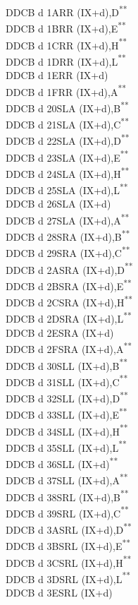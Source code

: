 \documentclass[twoside,openright,a4paper]{book}
\newcommand{\UNDOC}{\textnormal{\textsuperscript{**}}}
\begin{document}
\begin{multicols}{3}
{\begin{tabbing}
	DDCB d 1A\>RR (IX+d),D\UNDOC\\
	DDCB d 1B\>RR (IX+d),E\UNDOC\\
	DDCB d 1C\>RR (IX+d),H\UNDOC\\
	DDCB d 1D\>RR (IX+d),L\UNDOC\\
	DDCB d 1E\>RR (IX+d)\\
	DDCB d 1F\>RR (IX+d),A\UNDOC\\
	DDCB d 20\>SLA (IX+d),B\UNDOC\\
	DDCB d 21\>SLA (IX+d),C\UNDOC\\
	DDCB d 22\>SLA (IX+d),D\UNDOC\\
	DDCB d 23\>SLA (IX+d),E\UNDOC\\
	DDCB d 24\>SLA (IX+d),H\UNDOC\\
	DDCB d 25\>SLA (IX+d),L\UNDOC\\
	DDCB d 26\>SLA (IX+d)\\
	DDCB d 27\>SLA (IX+d),A\UNDOC\\
	DDCB d 28\>SRA (IX+d),B\UNDOC\\
	DDCB d 29\>SRA (IX+d),C\UNDOC\\
	DDCB d 2A\>SRA (IX+d),D\UNDOC\\
	DDCB d 2B\>SRA (IX+d),E\UNDOC\\
	DDCB d 2C\>SRA (IX+d),H\UNDOC\\
	DDCB d 2D\>SRA (IX+d),L\UNDOC\\
	DDCB d 2E\>SRA (IX+d)\\
	DDCB d 2F\>SRA (IX+d),A\UNDOC\\
	DDCB d 30\>SLL (IX+d),B\UNDOC\\
	DDCB d 31\>SLL (IX+d),C\UNDOC\\
	DDCB d 32\>SLL (IX+d),D\UNDOC\\
	DDCB d 33\>SLL (IX+d),E\UNDOC\\
	DDCB d 34\>SLL (IX+d),H\UNDOC\\
	DDCB d 35\>SLL (IX+d),L\UNDOC\\
	DDCB d 36\>SLL (IX+d)\UNDOC\\
	DDCB d 37\>SLL (IX+d),A\UNDOC\\
	DDCB d 38\>SRL (IX+d),B\UNDOC\\
	DDCB d 39\>SRL (IX+d),C\UNDOC\\
	DDCB d 3A\>SRL (IX+d),D\UNDOC\\
	DDCB d 3B\>SRL (IX+d),E\UNDOC\\
	DDCB d 3C\>SRL (IX+d),H\UNDOC\\
	DDCB d 3D\>SRL (IX+d),L\UNDOC\\
	DDCB d 3E\>SRL (IX+d)\\

\end{tabbing}}
\end{multicols}
\end{document}
